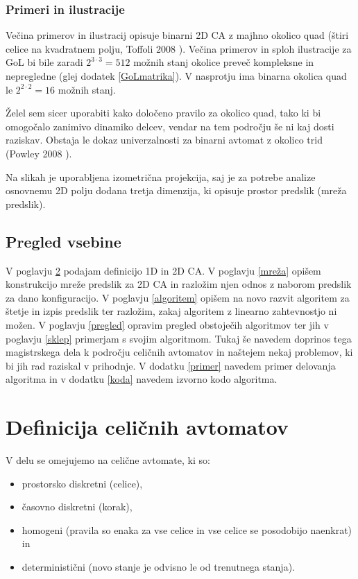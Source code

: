 \documentclass[12pt,a4paper,openany,twoside]{book}
\begin{document}
\subsection{Primeri in ilustracije}

Večina primerov in ilustracij opisuje binarni 2D CA z majhno okolico quad
(štiri celice na kvadratnem polju, Toffoli 2008 \cite{Toffoli2008}).
Večina primerov in sploh ilustracije za GoL bi bile zaradi
\(2^{3 \cdot 3}=512\) možnih stanj okolice preveč kompleksne in nepregledne (glej dodatek \ref{GoLmatrika}).
V nasprotju ima binarna okolica quad le \(2^{2 \cdot 2}=16\) možnih stanj.

Želel sem sicer uporabiti kako določeno pravilo za okolico quad,
tako ki bi omogočalo zanimivo dinamiko delcev, vendar na tem področju še ni kaj dosti raziskav.
Obstaja le dokaz univerzalnosti za binarni avtomat z okolico trid (Powley 2008 \cite{Powley2008}).

Na slikah je uporabljena izometrična projekcija,
saj je za potrebe analize osnovnemu 2D polju dodana tretja dimenzija,
ki opisuje prostor predslik (mreža predslik).

\section{Pregled vsebine}

V poglavju \ref{definicija} podajam definicijo 1D in 2D CA.
V poglavju \ref{mreža} opišem konstrukcijo mreže predslik za 2D CA
in razložim njen odnos z naborom predslik za dano konfiguracijo.
V poglavju \ref{algoritem} opišem na novo razvit algoritem za štetje in izpis predslik
ter razložim, zakaj algoritem z linearno zahtevnostjo ni možen.
V poglavju \ref{pregled} opravim pregled obstoječih algoritmov
ter jih v poglavju \ref{sklep} primerjam s svojim algoritmom.
Tukaj še navedem doprinos tega magistrskega dela k področju celičnih avtomatov
in naštejem nekaj problemov, ki bi jih rad raziskal v prihodnje.
V dodatku \ref{primer} navedem primer delovanja algoritma in
v dodatku \ref{koda} navedem izvorno kodo algoritma.




\chapter{Definicija celičnih avtomatov}
\label{definicija}

V delu se omejujemo na celične avtomate, ki so:
\begin{itemize}[noitemsep,nolistsep]
 \item prostorsko diskretni (celice),
 \item časovno diskretni (korak),
 \item homogeni (pravila so enaka za vse celice in vse celice se posodobijo naenkrat) in
 \item deterministični (novo stanje je odvisno le od trenutnega stanja).
\end{itemize}
\end{document}
